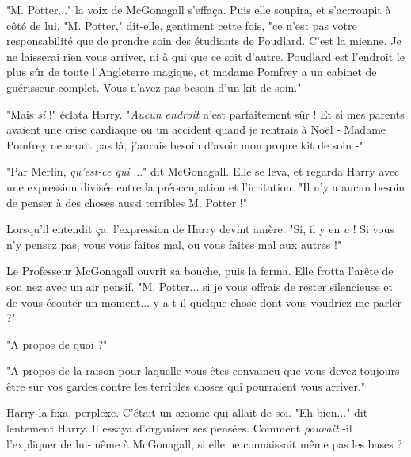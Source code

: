 "M. Potter..." la voix de McGonagall s'effaça. Puis elle soupira, et s'accroupit à côté de lui. "M. Potter," dit-elle, gentiment cette fois, "ce n'est pas votre responsabilité que de prendre soin des étudiants de Poudlard. C'est la mienne. Je ne laisserai rien vous arriver, ni à qui que ce soit d'autre. Poudlard est l'endroit le plus sûr de toute l'Angleterre magique, et madame Pomfrey a un cabinet de guérisseur complet. Vous n'avez pas besoin d'un kit de soin."

"Mais \emph{si}  !" éclata Harry. "\emph{Aucun endroit}  n'est parfaitement sûr ! Et si mes parents avaient une crise cardiaque ou un accident quand je rentrais à Noël - Madame Pomfrey ne serait pas là, j'aurais besoin d'avoir mon propre kit de soin -"

"Par Merlin, \emph{qu'est-ce qui} ..." dit McGonagall. Elle se leva, et regarda Harry avec une expression divisée entre la préoccupation et l'irritation. "Il n'y a aucun besoin de penser à des choses aussi terribles M. Potter !"

Lorsqu'il entendit ça, l'expression de Harry devint amère. "Si, il y en \emph{a}  ! Si vous n'y pensez pas, vous vous faites mal, ou vous faites mal aux autres !"

Le Professeur McGonagall ouvrit sa bouche, puis la ferma. Elle frotta l'arête de son nez avec un air pensif. "M. Potter... si je vous offrais de rester silencieuse et de vous écouter un moment... y a-t-il quelque chose dont vous voudriez me parler ?"

"A propos de quoi ?"

"A propos de la raison pour laquelle vous êtes convaincu que vous devez toujours être sur vos gardes contre les terribles choses qui pourraient vous arriver."

Harry la fixa, perplexe. C'était un axiome qui allait de soi. "Eh bien..." dit lentement Harry. Il essaya d'organiser ses pensées. Comment \emph{pouvait} -il l'expliquer de lui-même à McGonagall, si elle ne connaissait même pas les bases ?

